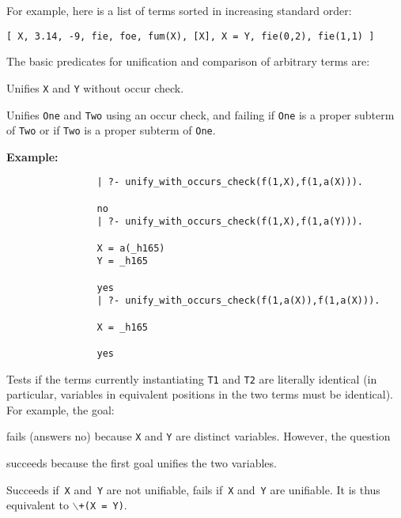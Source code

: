 For example, here is a list of terms sorted in increasing standard order:
\begin{center}
	{\tt [ X, 3.14, -9, fie, foe, fum(X), [X], X = Y, fie(0,2), fie(1,1) ]}
\end{center}
The basic predicates for unification and comparison of arbitrary terms are:
\begin{description}

    Unifies {\tt X} and {\tt Y} without occur check.

%
Unifies {\tt One} and {\tt Two} using an occur check, and failing if
{\tt One} is a proper subterm of {\tt Two} or if {\tt Two} is a proper
subterm of {\tt One}.  

{\bf Example:}
    {\footnotesize
     \begin{verbatim}
                | ?- unify_with_occurs_check(f(1,X),f(1,a(X))).

                no
                | ?- unify_with_occurs_check(f(1,X),f(1,a(Y))).

                X = a(_h165)
                Y = _h165

                yes
                | ?- unify_with_occurs_check(f(1,a(X)),f(1,a(X))).

                X = _h165

                yes
  \end{verbatim}}

    Tests if the terms currently instantiating {\tt T1} and {\tt T2}
    are literally identical (in particular, variables in equivalent positions
    in the two terms must be identical).
    For example, the goal:


    \noindent
    fails (answers no) because {\tt X} and {\tt Y} are distinct variables.
    However, the question


    \noindent
    succeeds because the first goal unifies the two variables.

    Succeeds if~{\tt X} and~{\tt Y} are not unifiable,
    fails if~{\tt X} and~{\tt Y} are unifiable.
    It is thus equivalent to {\tt $\backslash$+}\/{\tt (X = Y)}.


\end{description}
